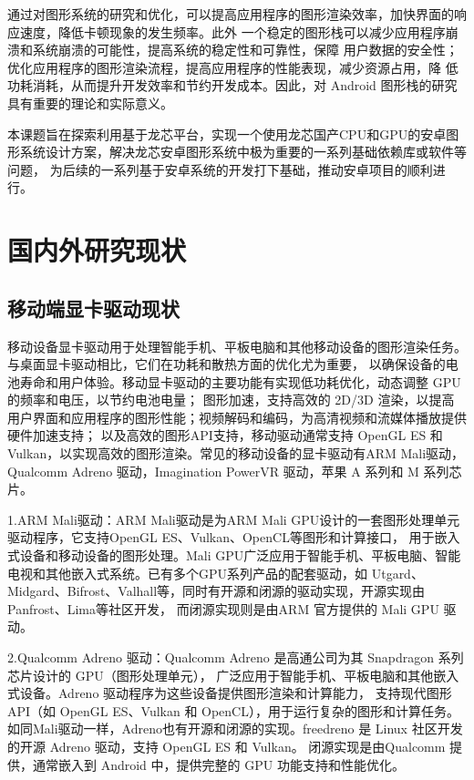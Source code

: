 通过对图形系统的研究和优化，可以提高应用程序的图形渲染效率，加快界面的响应速度，降低卡顿现象的发生频率。此外
一个稳定的图形栈可以减少应用程序崩溃和系统崩溃的可能性，提高系统的稳定性和可靠性，保障
用户数据的安全性；优化应用程序的图形渲染流程，提高应用程序的性能表现，减少资源占用，降
低功耗消耗，从而提升开发效率和节约开发成本。因此，对 Android 图形栈的研究具有重要的理论和实际意义。

本课题旨在探索利用基于龙芯平台，实现一个使用龙芯国产CPU和GPU的安卓图形系统设计方案，解决龙芯安卓图形系统中极为重要的一系列基础依赖库或软件等问题，
为后续的一系列基于安卓系统的开发打下基础，推动安卓项目的顺利进行。

\section{国内外研究现状}
\subsection{移动端显卡驱动现状}
移动设备显卡驱动用于处理智能手机、平板电脑和其他移动设备的图形渲染任务。与桌面显卡驱动相比，它们在功耗和散热方面的优化尤为重要，
以确保设备的电池寿命和用户体验。移动显卡驱动的主要功能有实现低功耗优化，动态调整 GPU 的频率和电压，以节约电池电量；
图形加速，支持高效的 2D/3D 渲染，以提高用户界面和应用程序的图形性能；视频解码和编码，为高清视频和流媒体播放提供硬件加速支持；
以及高效的图形API支持，移动驱动通常支持 OpenGL ES 和 Vulkan，以实现高效的图形渲染。常见的移动设备的显卡驱动有ARM Mali驱动，
Qualcomm Adreno 驱动，Imagination PowerVR 驱动，苹果 A 系列和 M 系列芯片。

1.ARM Mali驱动\cite{ARM}：ARM Mali驱动是为ARM Mali GPU设计的一套图形处理单元驱动程序，它支持OpenGL ES、Vulkan、OpenCL等图形和计算接口，
用于嵌入式设备和移动设备的图形处理。Mali GPU广泛应用于智能手机、平板电脑、智能电视和其他嵌入式系统。已有多个GPU系列产品的配套驱动，如
Utgard、Midgard、Bifrost、Valhall等，同时有开源和闭源的驱动实现，开源实现由Panfrost、Lima等社区开发，
而闭源实现则是由ARM 官方提供的 Mali GPU 驱动。

2.Qualcomm Adreno\cite{qualcomm} 驱动：Qualcomm Adreno 是高通公司为其 Snapdragon 系列芯片设计的 GPU（图形处理单元），
广泛应用于智能手机、平板电脑和其他嵌入式设备。Adreno 驱动程序为这些设备提供图形渲染和计算能力，
支持现代图形 API（如 OpenGL ES、Vulkan 和 OpenCL），用于运行复杂的图形和计算任务。
如同Mali驱动一样，Adreno也有开源和闭源的实现。freedreno 是 Linux 社区开发的开源 Adreno 驱动，支持 OpenGL ES 和 Vulkan。
闭源实现是由Qualcomm 提供，通常嵌入到 Android 中，提供完整的 GPU 功能支持和性能优化。

